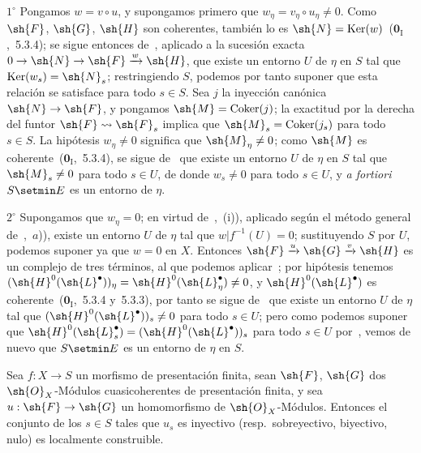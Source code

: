 $1^\circ$ Pongamos $w=v\circ u$, y supongamos primero que $w_\eta=v_\eta\circ u_\eta\neq 0$.
Como $\sh{F}$, $\sh{G}$, $\sh{H}$ son coherentes, también lo es $\sh{N}=\operatorname{Ker}(w)$~($\mathbf{0}_{\mathrm{I}}$,~5.3.4); se sigue entonces de~, aplicado a la sucesión exacta $0\to\sh{N}\to\sh{F}\xrightarrow{w}\sh{H}$, que existe un entorno $U$ de $\eta$ en $S$ tal que $\operatorname{Ker}(w_s)=\sh{N}_s$; restringiendo $S$, podemos por tanto suponer que esta relación se satisface para todo $s\in S$.
Sea $j$ la inyección canónica $\sh{N}\to\sh{F}$, y pongamos $\sh{M}=\operatorname{Coker}(j)$; la exactitud por la derecha del funtor $\sh{F}\leadsto\sh{F}_s$ implica que $\sh{M}_s=\operatorname{Coker}(j_s)$ para todo $s\in S$.
La hipótesis $w_\eta\neq 0$ significa que $\sh{M}_\eta\neq 0$; como $\sh{M}$ es coherente~($\mathbf{0}_{\mathrm{I}}$,~5.3.4), se sigue de~ que existe un entorno $U$ de $\eta$ en $S$ tal que $\sh{M}_s\neq 0$ para todo $s\in U$, de donde $w_s\neq 0$ para todo $s\in U$, y \emph{a fortiori} $S\setmin E$ es un entorno de $\eta$.

$2^\circ$ Supongamos que $w_\eta=0$; en virtud de~,~(i)), aplicado según el método general de~,~$a$)), existe un entorno $U$ de $\eta$ tal que $w|f^{-1}(U)=0$; sustituyendo $S$ por $U$, podemos suponer ya que $w=0$ en $X$.
Entonces $\sh{F}\xrightarrow{u}\sh{G}\xrightarrow{v}\sh{H}$ es un complejo de tres términos, al que podemos aplicar~; por hipótesis tenemos $(\sh{H}^0(\sh{L}^\bullet))_\eta=\sh{H}^0(\sh{L}^\bullet_\eta)\neq 0$, y $\sh{H}^0(\sh{L}^\bullet)$ es coherente~($\mathbf{0}_{\mathrm{I}}$,~5.3.4 y~5.3.3), por tanto se sigue de~ que existe un entorno $U$ de $\eta$ tal que $(\sh{H}^0(\sh{L}^\bullet))_s\neq 0$ para todo $s\in U$; pero como podemos suponer que $\sh{H}^0(\sh{L}^\bullet_s)=(\sh{H}^0(\sh{L}^\bullet))_s$ para todo $s\in U$ por~, vemos de nuevo que $S\setmin E$ es un entorno de $\eta$ en $S$.


\begin{corollary}[9.4.5]
\label{IV.9.4.5}
Sea $f:X\to S$ un morfismo de presentación finita, sean $\sh{F}$, $\sh{G}$ dos $\sh{O}_X$-Módulos cuasicoherentes de presentación finita, y sea $u:\sh{F}\to\sh{G}$ un homomorfismo de $\sh{O}_X$-Módulos.
Entonces el conjunto de los $s\in S$ tales que $u_s$ es inyectivo \textnormal{(resp.}\ sobreyectivo, biyectivo, nulo\textnormal{)} es localmente construible.
\end{corollary}

